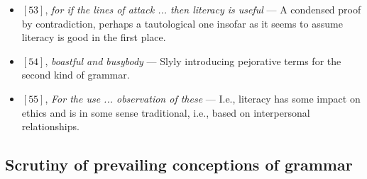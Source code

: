 \documentclass[12pt]{article}
\begin{document}
\begin{itemize}
\item $[53]$, \textit{for if the lines of attack ... then literacy is useful} --- A condensed proof by contradiction, perhaps a tautological one insofar as it seems to assume literacy is good in the first place.

\item $[54]$, \textit{boastful and busybody} --- Slyly introducing pejorative terms for the second kind of grammar.

\item $[55]$, \textit{For the use ... observation of these} --- I.e., literacy has some impact on ethics and is in some sense traditional, i.e., based on interpersonal relationships.

\end{itemize}

\subsection{Scrutiny of prevailing conceptions of grammar}
\end{document}
